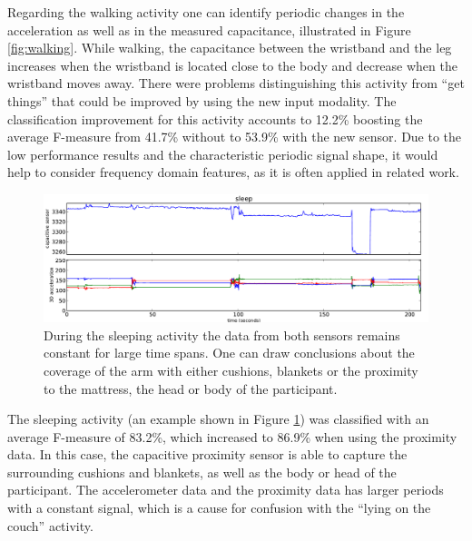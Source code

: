\documentclass[runningheads,a4paper]{llncs}
\begin{document}
Regarding the walking activity one can identify periodic changes in the acceleration as well as in the measured capacitance, illustrated in Figure \ref{fig:walking}. While walking, the capacitance between the wristband and the leg increases when the wristband is located close to the body and decrease when the wristband moves away. There were problems distinguishing this activity from ``get things'' that could be improved by using the new input modality. The classification improvement for this activity accounts to 12.2\% boosting the average F-measure from 41.7\% without to 53.9\% with the new sensor. Due to the low performance results and the characteristic periodic signal shape, it would help to consider frequency domain features, as it is often applied in related work.

\begin{figure}[t]
	\centering
		\includegraphics[width=1.00\textwidth]{../Auswertung/images/eugen_9.pdf}
	\caption{During the sleeping activity the data from both sensors remains constant for large time spans. One can draw conclusions about the coverage of the arm with either cushions, blankets or the proximity to the mattress, the head or body of the participant.}
	\label{fig:sleeping}
\end{figure}

The sleeping activity (an example shown in Figure \ref{fig:sleeping}) was classified with an average F-measure of 83.2\%, which increased to 86.9\% when using the proximity data. In this case, the capacitive proximity sensor is able to capture the surrounding cushions and blankets, as well as the body or head of the participant. The accelerometer data and the proximity data has larger periods with a constant signal, which is a cause for confusion with the ``lying on the couch'' activity.
\end{document}
